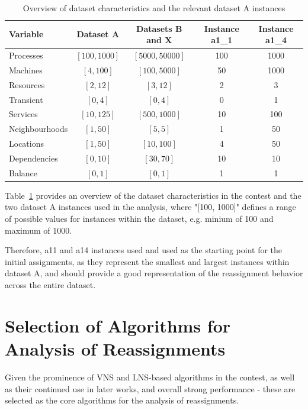 \documentclass[a4paper,12pt]{Classes/RoboticsLaTeX}
\begin{document}
\begin{table}[h]
    \centering
    \begin{tabular}{l|c|c|c|c}
        Variable & Dataset A & Datasets B and X & Instance a1\_1 & Instance a1\_4 \\ 
        \hline
        Processes      & \([100, 1000]\)   & \([5000, 50000]\) & 100  & 1000   \\ 
        Machines       & \([4, 100]\)      & \([100, 5000]\)   & 50 & 1000 \\ 
        Resources      & \([2, 12]\)       & \([3, 12]\)       & 2  & 3    \\
        Transient      & \([0, 4]\)        & \([0, 4]\)        & 0  & 1    \\ 
        Services       & \([10, 125]\)     & \([500, 1000]\)   & 10 & 100  \\ 
        Neighbourhoods & \([1, 50]\)       & \([5, 5]\)        & 1  & 50   \\ 
        Locations      & \([1, 50]\)       & \([10, 100]\)     & 4  & 50   \\ 
        Dependencies   & \([0, 10]\)       & \([30, 70]\)      & 10 & 10   \\ 
        Balance        & \([0, 1]\)        & \([0, 1]\)        & 1  & 1    \\ 
    \end{tabular}
    \caption{Overview of dataset characteristics and the relevant dataset A instances}
    \label{tab:dataset-characteristics}
\end{table}

Table~\ref{tab:dataset-characteristics} provides an overview of the dataset characteristics in the contest and the two dataset A instances used in the analysis, where "[100, 1000]" defines a range of possible values for instances within the dataset, e.g. minium of 100 and maximum of 1000.

Therefore, a11 and a14 instances used and used as the starting point for the initial assignments, as they represent the smallest and largest instances within dataset A, and should provide a good representation of the reassignment behavior across the entire dataset.

\section{Selection of Algorithms for Analysis of Reassignments}

Given the prominence of VNS and LNS-based algorithms in the contest, as well as their continued use in later works, and overall strong performance - these are selected as the core algorithms for the analysis of reassignments.
\end{document}
